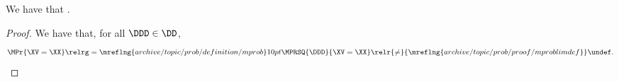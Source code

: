 \begin{proposition}
  We have that \mpproblimdefprop.%
\end{proposition}

\begin{proof}
  We have that, for all $\DDD \in \DD$,
    $$ \MPr{\XV = \XX} \relrg = {\mreflng{archive/topic/prob/definition/mprob}} 10pt
                    \MPRSQ{\DDD}{\XV = \XX}
                    \relr {\ne} {\mreflng{archive/topic/prob/proof/mproblimdef}}
                    \undef.$$%
\end{proof}
